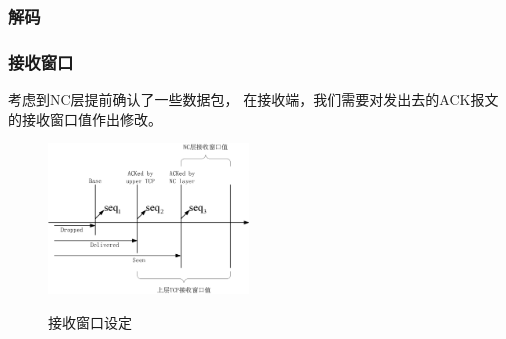 \begin{frame}
	\frametitle{解码}
\end{frame}

\begin{frame}
	\frametitle{接收窗口}
	考虑到NC层提前确认了一些数据包，
	在接收端，我们需要对发出去的ACK报文的接收窗口值作出修改。
	\begin{figure}
		\includegraphics[height=4cm]{../figures/rcvwnd.eps}
		\label{fig:rcvwnd}
		\caption{接收窗口设定}
	\end{figure}
\end{frame}

